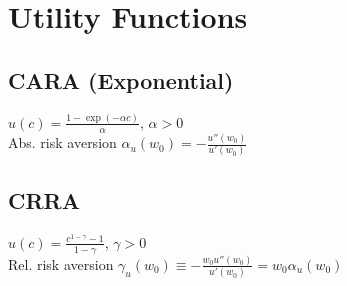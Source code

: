 \section{Utility Functions}
	\subsection*{CARA (Exponential)}
	$u\left(c\right) = \frac{1 - \exp\left(-\alpha c\right)}{\alpha}$, $\alpha > 0$\\
	Abs. risk aversion $\alpha_{u}\left(w_{0}\right) = -\frac{u''\left(w_{0}\right)}{u'\left(w_{0}\right)}$
	
	\subsection*{CRRA}
	$u\left(c\right) = \frac{c^{1 - \gamma} - 1}{1 - \gamma}$, $\gamma > 0$\\
	Rel. risk aversion $\gamma_{u}\left(w_{0}\right)\equiv -\frac{w_{0}u''\left(w_{0}\right)}{u'\left(w_{0}\right)} = w_{0}\alpha_{u}\left(w_{0}\right)$
